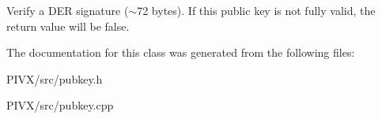 Verify a D\+ER signature ($\sim$72 bytes). If this public key is not fully valid, the return value will be false. 

The documentation for this class was generated from the following files\+:\begin{DoxyCompactItemize}
\item 
P\+I\+V\+X/src/pubkey.\+h\item 
P\+I\+V\+X/src/pubkey.\+cpp\end{DoxyCompactItemize}
